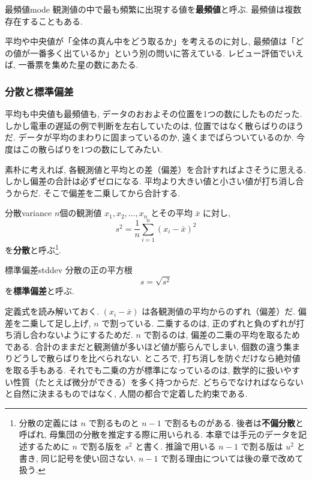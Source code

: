     \begin{defi}{最頻値}{mode}
      観測値の中で最も頻繁に出現する値を\textbf{最頻値}と呼ぶ.
      最頻値は複数存在することもある.
    \end{defi}

    平均や中央値が「全体の真ん中をどう取るか」を考えるのに対し, 最頻値は「どの値が一番多く出ているか」という別の問いに答えている.
    レビュー評価でいえば, 一番票を集めた星の数にあたる.

    \subsubsection*{分散と標準偏差}

    平均も中央値も最頻値も, データのおおよその位置を1つの数にしたものだった.
    しかし電車の遅延の例で判断を左右していたのは, 位置ではなく散らばりのほうだ.
    データが平均のまわりに固まっているのか, 遠くまでばらついているのか.
    今度はこの散らばりを1つの数にしてみたい.

    素朴に考えれば, 各観測値と平均との差（偏差）を合計すればよさそうに思える.
    しかし偏差の合計は必ずゼロになる.
    平均より大きい値と小さい値が打ち消し合うからだ.
    そこで偏差を二乗してから合計する.

    \begin{defi}{分散}{variance}
      $n$個の観測値 $x_1, x_2, \ldots, x_n$ とその平均 $\bar{x}$ に対し,
      \[
        s^2 = \frac{1}{n} \sum_{i=1}^{n} (x_i - \bar{x})^2
      \]
      を\textbf{分散}と呼ぶ\footnote{%
        分散の定義には $n$ で割るものと $n-1$ で割るものがある.
        後者は\textbf{不偏分散}と呼ばれ, 母集団の分散を推定する際に用いられる.
        本章では手元のデータを記述するために $n$ で割る版を $s^2$ と書く.
        推論で用いる $n-1$ で割る版は $u^2$ と書き, 同じ記号を使い回さない.
        $n-1$ で割る理由については後の章で改めて扱う.}.
    \end{defi}

    \begin{defi}{標準偏差}{stddev}
      分散の正の平方根
      \[
        s = \sqrt{s^2}
      \]
      を\textbf{標準偏差}と呼ぶ.
    \end{defi}

    定義式を読み解いておく.
    $(x_i - \bar{x})$ は各観測値の平均からのずれ（偏差）だ.
    偏差を二乗して足し上げ, $n$ で割っている.
    二乗するのは, 正のずれと負のずれが打ち消し合わないようにするためだ.
    $n$ で割るのは, 偏差の二乗の平均を取るためである.
    合計のままだと観測値が多いほど値が膨らんでしまい, 個数の違う集まりどうしで散らばりを比べられない.
    ところで, 打ち消しを防ぐだけなら絶対値を取る手もある.
    それでも二乗の方が標準になっているのは, 数学的に扱いやすい性質（たとえば微分ができる）を多く持つからだ.
    どちらでなければならないと自然に決まるものではなく, 人間の都合で定着した約束である.

